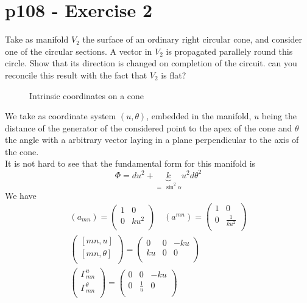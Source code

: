 \section{p108 - Exercise 2}
\begin{tcolorbox}
Take as manifold $V_2$ the surface of an ordinary right circular cone, and consider one of the circular sections. A vector in $V_2$ is propagated parallely round this circle. Show that its direction is changed on completion of the circuit. can you reconcile this result with the fact that $V_2$ is flat?
\end{tcolorbox}
\begin{figure}[h]
\center

\caption{Intrinsic coordinates on  a cone}
\end{figure}
We take as coordinate system $\left(u,\theta \right)$, embedded in the manifold, $u$ being the distance of the generator of the considered point to the apex of the cone and $\theta$ the angle with a arbitrary vector laying in a plane perpendicular to the axis of the cone.\\
It is not hard to see that the fundamental form for this manifold is $$ \Phi = du^2+ \underbrace{k}_{= \ \sin^2 \alpha}u^2 d\theta^2 $$ 
We have 
\begin{align}
 (a_{mn})= \begin{pmatrix}
 1&0  \\
 0& k u^2 \\
\end{pmatrix}\quad
 (a^{mn})= \begin{pmatrix}
 1&0  \\
 0& \frac{1}{k u^2} \\
\end{pmatrix}\\
 \begin{pmatrix}
 \left[ mn,u \right] \\
 \left[ mn,\theta \right] \\
\end{pmatrix}=\begin{pmatrix}
 0&0&-k u \\
 k u&0&0 \\
\end{pmatrix}\\
 \begin{pmatrix}
 \Gamma^u_{mn} \\
 \Gamma^{\theta}_{mn} \\
\end{pmatrix}=\begin{pmatrix}
 0&0&-k u \\
 0&\frac{1}{u}&0 \\
\end{pmatrix}
\end{align}

